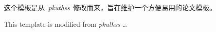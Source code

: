 
\cleardoublepage
\begin{cabstract}

	这个模板是从~\textit{pkuthss}~修改而来，旨在维护一个方便易用的论文模板。
\end{cabstract}

\cleardoublepage
\begin{eabstract}
	
	This template is modified from \textit{pkuthss} \ldots 
\end{eabstract}

